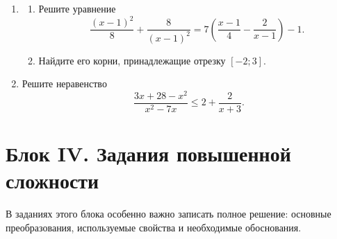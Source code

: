 \documentclass[a4paper,12pt]{article}
\newcommand{\taskspace}{\par\vspace{0.55cm}}
\begin{document}
\begin{enumerate}[resume]
\item
\begin{enumerate}[
  label=\alph*),
  leftmargin=8mm,
  itemsep=0.55em,
  topsep=0pt
]
  \item Решите уравнение
  \[
  \frac{(x-1)^2}{8}+\frac{8}{(x-1)^2}
  =
  7\left(\frac{x-1}{4}-\frac{2}{x-1}\right)-1.
  \]
  \item Найдите его корни, принадлежащие отрезку $[-2;3]$.
\end{enumerate}
\taskspace

\item Решите неравенство
\[
\frac{3x+28-x^2}{x^2-7x}
\le
2+\frac{2}{x+3}.
\]
\taskspace

\end{enumerate}

\newpage


\section*{Блок IV. Задания повышенной сложности}

{\color{soft}
В заданиях этого блока особенно важно записать полное решение:
основные преобразования, используемые свойства и необходимые обоснования.
}

\vspace{4mm}
\end{document}
